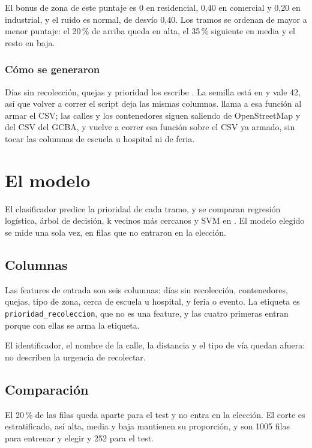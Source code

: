 \documentclass[12pt,a4paper]{report}
\begin{document}
El bonus de zona de este puntaje es 0 en residencial, 0,40 en comercial y 0,20 en industrial, y el ruido es normal, de desvío 0,40. Los tramos se ordenan de mayor a menor puntaje: el 20\,\% de arriba queda en alta, el 35\,\% siguiente en media y el resto en baja.

\subsection{Cómo se generaron}

Días sin recolección, quejas y prioridad los escribe . La semilla está en  y vale 42, así que volver a correr el script deja las mismas columnas.  llama a esa función al armar el CSV; las calles y los contenedores siguen saliendo de OpenStreetMap y del CSV del GCBA, y  vuelve a correr esa función sobre el CSV ya armado, sin tocar las columnas de escuela u hospital ni de feria.

\chapter{El modelo}

El clasificador predice la prioridad de cada tramo, y se comparan regresión logística, árbol de decisión, k vecinos más cercanos y SVM en . El modelo elegido se mide una sola vez, en filas que no entraron en la elección.

\section{Columnas}

Las features de entrada son seis columnas: días sin recolección, contenedores, quejas, tipo de zona, cerca de escuela u hospital, y feria o evento. La etiqueta es \texttt{prioridad\_recoleccion}, que no es una feature, y las cuatro primeras entran porque con ellas se arma la etiqueta.

El identificador, el nombre de la calle, la distancia y el tipo de vía quedan afuera: no describen la urgencia de recolectar.

\section{Comparación}

El 20\,\% de las filas queda aparte para el test y no entra en la elección. El corte es estratificado, así alta, media y baja mantienen su proporción, y son 1005 filas para entrenar y elegir y 252 para el test.
\end{document}
